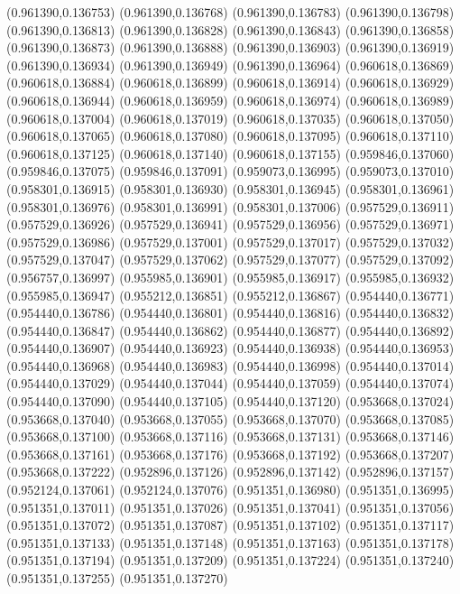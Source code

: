 (0.961390,0.136753)
(0.961390,0.136768)
(0.961390,0.136783)
(0.961390,0.136798)
(0.961390,0.136813)
(0.961390,0.136828)
(0.961390,0.136843)
(0.961390,0.136858)
(0.961390,0.136873)
(0.961390,0.136888)
(0.961390,0.136903)
(0.961390,0.136919)
(0.961390,0.136934)
(0.961390,0.136949)
(0.961390,0.136964)
(0.960618,0.136869)
(0.960618,0.136884)
(0.960618,0.136899)
(0.960618,0.136914)
(0.960618,0.136929)
(0.960618,0.136944)
(0.960618,0.136959)
(0.960618,0.136974)
(0.960618,0.136989)
(0.960618,0.137004)
(0.960618,0.137019)
(0.960618,0.137035)
(0.960618,0.137050)
(0.960618,0.137065)
(0.960618,0.137080)
(0.960618,0.137095)
(0.960618,0.137110)
(0.960618,0.137125)
(0.960618,0.137140)
(0.960618,0.137155)
(0.959846,0.137060)
(0.959846,0.137075)
(0.959846,0.137091)
(0.959073,0.136995)
(0.959073,0.137010)
(0.958301,0.136915)
(0.958301,0.136930)
(0.958301,0.136945)
(0.958301,0.136961)
(0.958301,0.136976)
(0.958301,0.136991)
(0.958301,0.137006)
(0.957529,0.136911)
(0.957529,0.136926)
(0.957529,0.136941)
(0.957529,0.136956)
(0.957529,0.136971)
(0.957529,0.136986)
(0.957529,0.137001)
(0.957529,0.137017)
(0.957529,0.137032)
(0.957529,0.137047)
(0.957529,0.137062)
(0.957529,0.137077)
(0.957529,0.137092)
(0.956757,0.136997)
(0.955985,0.136901)
(0.955985,0.136917)
(0.955985,0.136932)
(0.955985,0.136947)
(0.955212,0.136851)
(0.955212,0.136867)
(0.954440,0.136771)
(0.954440,0.136786)
(0.954440,0.136801)
(0.954440,0.136816)
(0.954440,0.136832)
(0.954440,0.136847)
(0.954440,0.136862)
(0.954440,0.136877)
(0.954440,0.136892)
(0.954440,0.136907)
(0.954440,0.136923)
(0.954440,0.136938)
(0.954440,0.136953)
(0.954440,0.136968)
(0.954440,0.136983)
(0.954440,0.136998)
(0.954440,0.137014)
(0.954440,0.137029)
(0.954440,0.137044)
(0.954440,0.137059)
(0.954440,0.137074)
(0.954440,0.137090)
(0.954440,0.137105)
(0.954440,0.137120)
(0.953668,0.137024)
(0.953668,0.137040)
(0.953668,0.137055)
(0.953668,0.137070)
(0.953668,0.137085)
(0.953668,0.137100)
(0.953668,0.137116)
(0.953668,0.137131)
(0.953668,0.137146)
(0.953668,0.137161)
(0.953668,0.137176)
(0.953668,0.137192)
(0.953668,0.137207)
(0.953668,0.137222)
(0.952896,0.137126)
(0.952896,0.137142)
(0.952896,0.137157)
(0.952124,0.137061)
(0.952124,0.137076)
(0.951351,0.136980)
(0.951351,0.136995)
(0.951351,0.137011)
(0.951351,0.137026)
(0.951351,0.137041)
(0.951351,0.137056)
(0.951351,0.137072)
(0.951351,0.137087)
(0.951351,0.137102)
(0.951351,0.137117)
(0.951351,0.137133)
(0.951351,0.137148)
(0.951351,0.137163)
(0.951351,0.137178)
(0.951351,0.137194)
(0.951351,0.137209)
(0.951351,0.137224)
(0.951351,0.137240)
(0.951351,0.137255)
(0.951351,0.137270)
